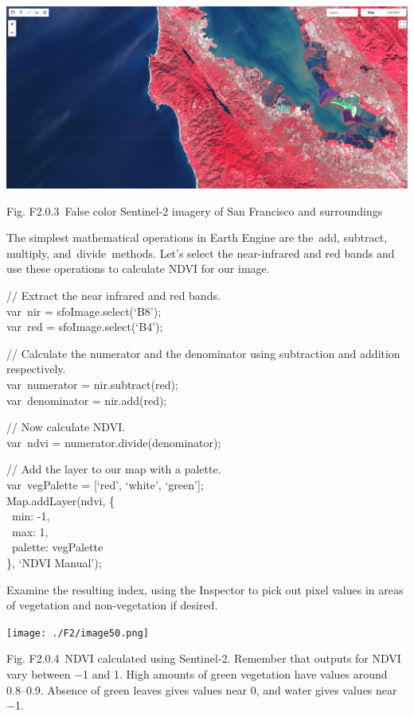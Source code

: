 \documentclass[
  letterpaper,
  DIV=11,
  numbers=noendperiod]{scrreprt}
\begin{document}
\includegraphics{./F2/image46.png}

Fig. F2.0.3~False color Sentinel-2 imagery of San Francisco and
surroundings

The simplest mathematical operations in Earth Engine are the~add,
subtract, multiply, and~divide~methods. Let's select the near-infrared
and red bands and use these operations to calculate NDVI for our image.

// Extract the near infrared and red bands.\\
var~nir = sfoImage.select(`B8');\\
var~red = sfoImage.select(`B4');

// Calculate the numerator and the denominator using subtraction and
addition respectively.\\
var~numerator = nir.subtract(red);\\
var~denominator = nir.add(red);

// Now calculate NDVI.\\
var~ndvi = numerator.divide(denominator);

// Add the layer to our map with a palette.\\
var~vegPalette = {[}`red', `white', `green'{]};\\
Map.addLayer(ndvi, \{\\
\hspace*{0.333em} ~min: -1,\\
\hspace*{0.333em} ~max: 1,\\
\hspace*{0.333em} ~palette: vegPalette\\
\}, `NDVI Manual');

Examine the resulting index, using the Inspector to pick out pixel
values in areas of vegetation and non-vegetation if desired.

\texttt{[image: ./F2/image50.png]}

Fig. F2.0.4~NDVI calculated using Sentinel-2. Remember that outputs for
NDVI vary between −1 and 1. High amounts of green vegetation have values
around 0.8--0.9. Absence of green leaves gives values near 0, and water
gives values near −1.
\end{document}
